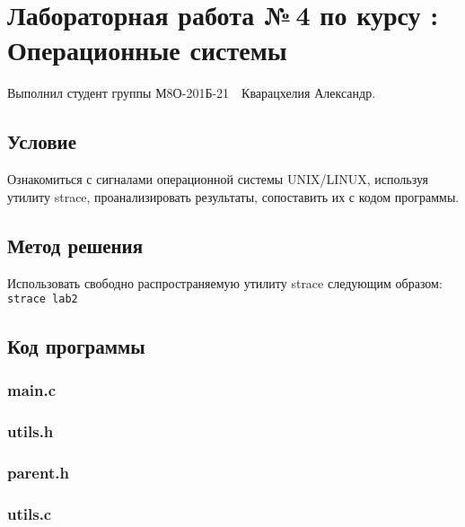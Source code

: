 \documentclass[12pt]{article}
\begin{document}
	
	\section*{\centering Лабораторная работа №\,4 по курсу :\\ Операционные системы}
	
	Выполнил студент группы М8О-201Б-21 \,\, Кварацхелия Александр.
	
	\subsection*{Условие}
	
	Ознакомиться с сигналами операционной системы UNIX/LINUX, используя утилиту strace, проанализировать результаты, сопоставить их с кодом программы.
	
	
	\subsection*{Метод решения}
	
	Использовать свободно распространяемую утилиту strace следующим образом: \\
	\lstinline[]|strace lab2|
	
	\subsection*{Код программы}
	
	\subsubsection*{main.c}
	
	
	
	\subsubsection*{utils.h}
	
	
	
	\subsubsection*{parent.h}
	
	
	
	\subsubsection*{utils.c}
	
\end{document}
